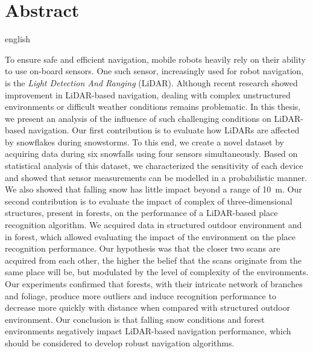 \chapter*{Abstract} 

\begin{otherlanguage*}{english}

To ensure safe and efficient navigation, mobile robots heavily rely on their ability to use on-board sensors. One such sensor, increasingly used for robot navigation, is the \emph{Light Detection And Ranging} (LiDAR). Although recent research showed improvement in LiDAR-based navigation, dealing with complex unstructured environments or difficult weather conditions remains problematic. In this thesis, we present an analysis of the influence of such challenging conditions on LiDAR-based navigation. Our first contribution is to evaluate how LiDARs are affected by snowflakes during snowstorms. To this end, we create a novel dataset by acquiring data during six snowfalls using four sensors simultaneously. Based on statistical analysis of this dataset, we characterized the sensitivity of each device and showed that sensor measurements can be modelled in a probabilistic manner. We also showed that falling snow has little impact beyond a range of \SI{10}{\meter}. Our second contribution is to evaluate the impact of complex of three-dimensional structures, present in forests, on the performance of a LiDAR-based place recognition algorithm. We acquired data in structured outdoor environment and in forest, which allowed evaluating the impact of the environment on the place recognition performance. Our hypothesis was that the closer two scans are acquired from each other, the higher the belief that the scans originate from the same place will be, but modulated by the level of complexity of the environments. Our experiments confirmed that forests, with their intricate network of branches and foliage, produce more outliers and induce recognition performance to decrease more quickly with distance when compared with structured outdoor environment. Our conclusion is that falling snow conditions and forest environments negatively impact LiDAR-based navigation performance, which should be considered to develop robust navigation algorithms.

\end{otherlanguage*}
